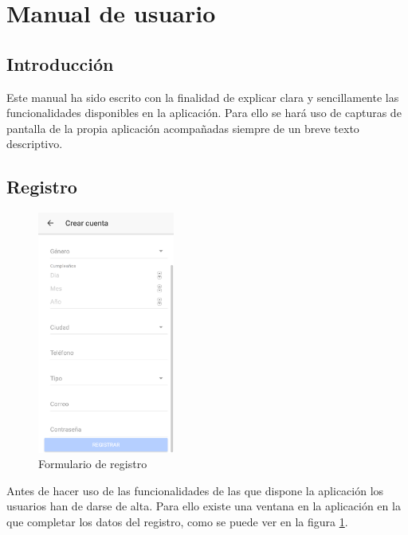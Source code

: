 \section{Manual de usuario}

\subsection{Introducción}
Este manual ha sido escrito con la finalidad de explicar clara y
sencillamente las funcionalidades disponibles en la aplicación. Para ello se
hará uso de capturas de pantalla de la propia aplicación acompañadas siempre
de un breve texto descriptivo.

\subsection{Registro}
\begin{figure}[!h]
    \centering
    \includegraphics[width=0.4\textwidth]{images/screenshots/Registro.png}
    \caption{Formulario de registro}
    \label{formulario-registro}
\end{figure}

Antes de hacer uso de las funcionalidades de las que dispone la aplicación
los usuarios han de darse de alta. Para ello existe una ventana en la
aplicación en la que completar los datos del registro, como se puede ver en
la figura \ref{formulario-registro}.
\clearpage

